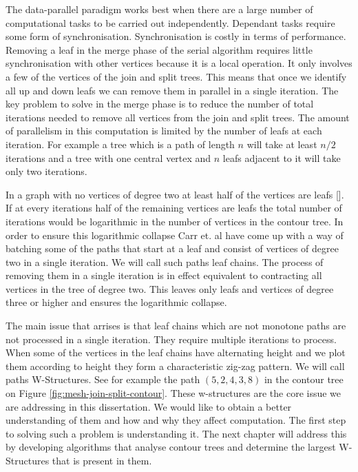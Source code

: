 The data-parallel paradigm works best when there are a large number of computational tasks to be carried out independently. Dependant tasks require some form of synchronisation. Synchronisation is costly in terms of performance. Removing a leaf in the merge phase of the serial algorithm requires little synchronisation with other vertices because it is a local operation. It only involves a few of the vertices of the join and split trees. This means that once we identify all up and down leafs we can remove them in parallel in a single iteration. The key problem to solve in the merge phase is to reduce the number of total iterations needed to remove all vertices from the join and split trees. The amount of parallelism in this computation is limited by the number of leafs at each iteration. For example a tree which is a path of length $n$ will take at least $n/2$ iterations and a tree with one central vertex and $n$ leafs adjacent to it will take only two iterations.

In a graph with no vertices of degree two at least half of the vertices are leafs []. If at every iterations half of the remaining vertices are leafs the total number of iterations would be logarithmic in the number of vertices in the contour tree. In order to ensure this logarithmic collapse Carr et. al \cite{parallel-peak-pruning} have come up with a way of batching some of the paths that start at a leaf and consist of vertices of degree two in a single iteration. We will call such paths leaf chains. The process of removing them in a single iteration is in effect equivalent to contracting all vertices in the tree of degree two. This leaves only leafs and vertices of degree three or higher and ensures the logarithmic collapse.

The main issue that arrises is that leaf chains which are not monotone paths are not processed in a single iteration. They require multiple iterations to process. When some of the vertices in the leaf chains have alternating height and we plot them according to height they form a characteristic zig-zag pattern. We will call paths W-Structures. See for example the path $(5, 2, 4, 3, 8)$ in the contour tree on Figure \ref{fig:mesh-join-split-contour}. These w-structures are the core issue we are addressing in this dissertation. We would like to obtain a better understanding of them and how and why they affect computation. The first step to solving such a problem is understanding it. The next chapter will address this by developing algorithms that analyse contour trees and determine the largest W-Structures that is present in them.

